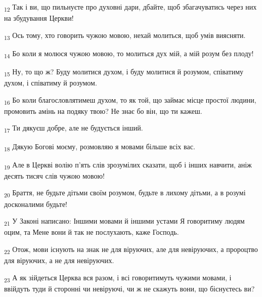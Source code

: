 \begin{tcolorbox}
\textsubscript{12} Так і ви, що пильнуєте про духовні дари, дбайте, щоб збагачуватись через них на збудування Церкви!
\end{tcolorbox}
\begin{tcolorbox}
\textsubscript{13} Ось тому, хто говорить чужою мовою, нехай молиться, щоб умів виясняти.
\end{tcolorbox}
\begin{tcolorbox}
\textsubscript{14} Бо коли я молюся чужою мовою, то молиться дух мій, а мій розум без плоду!
\end{tcolorbox}
\begin{tcolorbox}
\textsubscript{15} Ну, то що ж? Буду молитися духом, і буду молитися й розумом, співатиму духом, і співатиму й розумом.
\end{tcolorbox}
\begin{tcolorbox}
\textsubscript{16} Бо коли благословлятимеш духом, то як той, що займає місце простої людини, промовить амінь на подяку твою? Не знає бо він, що ти кажеш.
\end{tcolorbox}
\begin{tcolorbox}
\textsubscript{17} Ти дякуєш добре, але не будується інший.
\end{tcolorbox}
\begin{tcolorbox}
\textsubscript{18} Дякую Богові моєму, розмовляю я мовами більше всіх вас.
\end{tcolorbox}
\begin{tcolorbox}
\textsubscript{19} Але в Церкві волію п'ять слів зрозумілих сказати, щоб і інших навчити, аніж десять тисяч слів чужою мовою!
\end{tcolorbox}
\begin{tcolorbox}
\textsubscript{20} Браття, не будьте дітьми своїм розумом, будьте в лихому дітьми, а в розумі досконалими будьте!
\end{tcolorbox}
\begin{tcolorbox}
\textsubscript{21} У Законі написано: Іншими мовами й іншими устами Я говоритиму людям оцим, та Мене вони й так не послухають, каже Господь.
\end{tcolorbox}
\begin{tcolorbox}
\textsubscript{22} Отож, мови існують на знак не для віруючих, але для невіруючих, а пророцтво для віруючих, а не для невіруючих.
\end{tcolorbox}
\begin{tcolorbox}
\textsubscript{23} А як зійдеться Церква вся разом, і всі говоритимуть чужими мовами, і ввійдуть туди й сторонні чи невіруючі, чи ж не скажуть вони, що біснуєтесь ви?
\end{tcolorbox}
